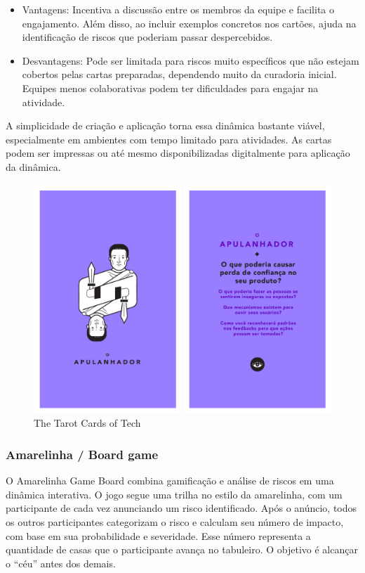 \documentclass[
	12pt,
	openright,
	twoside,
	a4paper,
	english,
	brazil
	]{abntex2}
\begin{document}
\begin{itemize}
  \item Vantagens: Incentiva a discussão entre os membros da equipe e facilita o engajamento. Além disso, ao incluir exemplos concretos nos cartões, ajuda na identificação de riscos que poderiam passar despercebidos.
  \item Desvantagens: Pode ser limitada para riscos muito específicos que não estejam cobertos pelas cartas preparadas, dependendo muito da curadoria inicial. Equipes menos colaborativas podem ter dificuldades para engajar na atividade.
\end{itemize}

A simplicidade de criação e aplicação torna essa dinâmica bastante viável, especialmente em ambientes com tempo limitado para atividades. As cartas podem ser impressas ou até mesmo disponibilizadas digitalmente para aplicação da dinâmica.

\begin{figure}[H]
	\caption{\label{tarot-da-tecnologia}The Tarot Cards of Tech}
  \includegraphics[width=\textwidth]{tarot-da-tecnologia}
\end{figure}

\subsubsection{Amarelinha / Board game}

O Amarelinha Game Board combina gamificação e análise de riscos em uma dinâmica interativa. O jogo segue uma trilha no estilo da amarelinha, com um participante de cada vez anunciando um risco identificado. Após o anúncio, todos os outros participantes categorizam o risco e calculam seu número de impacto, com base em sua probabilidade e severidade. Esse número representa a quantidade de casas que o participante avança no tabuleiro. O objetivo é alcançar o “céu” antes dos demais.
\end{document}

